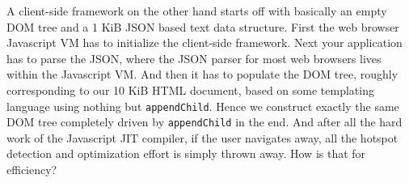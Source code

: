 A client-side framework on the other hand starts off with basically an empty DOM tree and a 1 KiB JSON based text data structure.
First the web browser Javascript VM has to initialize the client-side framework.
Next your application has to parse the JSON, where the JSON parser for most web browsers lives within the Javascript VM.
And then it has to populate the DOM tree, roughly corresponding to our 10 KiB HTML document, based on some templating language using nothing but \texttt{appendChild}.
Hence we construct exactly the same DOM tree completely driven by \texttt{appendChild} in the end.
And after all the hard work of the Javascript JIT compiler, if the user navigates away, all the hotspot detection and optimization effort is simply thrown away.
How is that for efficiency?
